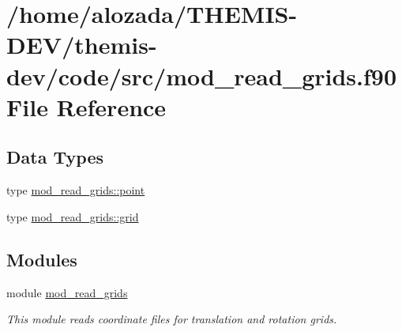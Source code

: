 \hypertarget{mod__read__grids_8f90}{}\section{/home/alozada/\+T\+H\+E\+M\+I\+S-\/\+D\+E\+V/themis-\/dev/code/src/mod\+\_\+read\+\_\+grids.f90 File Reference}
\label{mod__read__grids_8f90}
\subsection*{Data Types}
\begin{DoxyCompactItemize}
\item 
type \hyperlink{structmod__read__grids_1_1point}{mod\+\_\+read\+\_\+grids\+::point}
\item 
type \hyperlink{structmod__read__grids_1_1grid}{mod\+\_\+read\+\_\+grids\+::grid}
\end{DoxyCompactItemize}
\subsection*{Modules}
\begin{DoxyCompactItemize}
\item 
module \hyperlink{namespacemod__read__grids}{mod\+\_\+read\+\_\+grids}
\begin{DoxyCompactList}\small\item\em This module reads coordinate files for translation and rotation grids. \end{DoxyCompactList}\end{DoxyCompactItemize}
